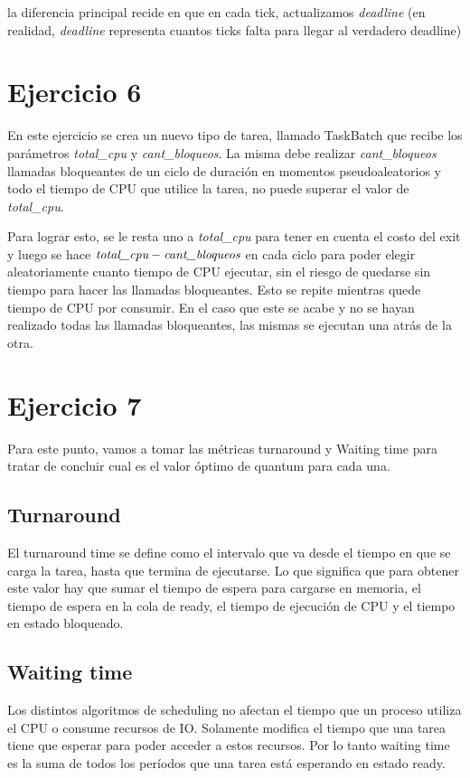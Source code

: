 \documentclass[a4paper,11pt]{article}
\begin{document}
	la diferencia principal recide en que en cada tick, actualizamos \emph{deadline} (en realidad, \emph{deadline} representa cuantos ticks falta para llegar al verdadero deadline)
			
	

\section{Ejercicio 6}

En este ejercicio se crea un nuevo tipo de tarea, llamado TaskBatch que recibe los parámetros \emph{total\_cpu} y \emph{cant\_bloqueos}. La misma debe realizar \emph{cant\_bloqueos} llamadas bloqueantes de un ciclo de duración en momentos pseudoaleatorios y todo el tiempo de CPU que utilice la tarea, no puede superar el valor de \emph{total\_cpu}.

Para lograr esto, se le resta uno a \emph{total\_cpu} para tener en cuenta el costo del exit y luego se hace $\emph{total\_cpu} - \emph{cant\_bloqueos}$ en cada ciclo para poder elegir aleatoriamente cuanto tiempo de CPU ejecutar, sin el riesgo de quedarse sin tiempo para hacer las llamadas bloqueantes. Esto se repite mientras quede tiempo de CPU por consumir. En el caso que este se acabe y no se hayan realizado todas las llamadas bloqueantes, las mismas se ejecutan una atrás de la otra.


\pagebreak

\section{Ejercicio 7}
Para este punto, vamos a tomar las métricas turnaround y Waiting time para tratar de concluir cual es el valor óptimo de quantum para cada una.

\subsection{Turnaround}
El turnaround time se define como el intervalo que va desde el tiempo en que se carga la tarea, hasta que termina de ejecutarse. Lo que significa que para obtener este valor hay que sumar el tiempo de espera para cargarse en memoria, el tiempo de espera en la cola de ready, el tiempo de ejecución de CPU y el tiempo en estado bloqueado.

\subsection{Waiting time}
Los distintos algoritmos de scheduling no afectan el tiempo que un proceso utiliza el CPU o consume recursos de IO. Solamente modifica el tiempo que una tarea tiene que esperar para poder acceder a estos recursos. Por lo tanto waiting time es la suma de todos los períodos que una tarea está esperando en estado ready.
\end{document}
